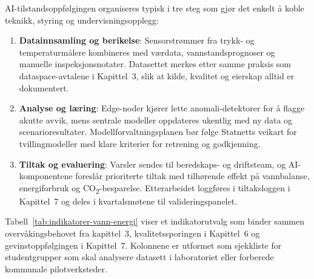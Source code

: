 AI-tilstandsoppfølgingen organiseres typisk i tre steg som gjør det enkelt å koble teknikk, styring og undervisningsopplegg:
\begin{enumerate}
    \item \textbf{Datainnsamling og berikelse}: Sensorstrømmer fra trykk- og temperaturmålere kombineres med værdata, vannstandsprognoser og manuelle inspeksjonsnotater. Datasettet merkes etter samme praksis som dataspace-avtalene i Kapittel~3, slik at kilde, kvalitet og eierskap alltid er dokumentert.
    \item \textbf{Analyse og læring}: Edge-noder kjører lette anomali-detektorer for å flagge akutte avvik, mens sentrale modeller oppdateres ukentlig med ny data og scenarioresultater. Modellforvaltningsplanen bør følge Statnetts veikart for tvillingmodeller med klare kriterier for retrening og godkjenning.\citep{statnett2023modellforvaltning}
    \item \textbf{Tiltak og evaluering}: Varsler sendes til beredskaps- og driftsteam, og AI-komponentene foreslår prioriterte tiltak med tilhørende effekt på vannbalanse, energiforbruk og CO\textsubscript{2}-besparelse. Etterarbeidet loggføres i tiltaksloggen i Kapittel~7 og deles i kvartalsmøtene til valideringspanelet.
\end{enumerate}

Tabell~\ref{tab:indikatorer-vann-energi} viser et indikatorutvalg som binder sammen overvåkingsbehovet fra kapittel~3, kvalitetssporingen i Kapittel~6 og gevinstoppfølgingen i Kapittel~7. Kolonnene er utformet som sjekkliste for studentgrupper som skal analysere datasett i laboratoriet eller forberede kommunale pilotverksteder.


